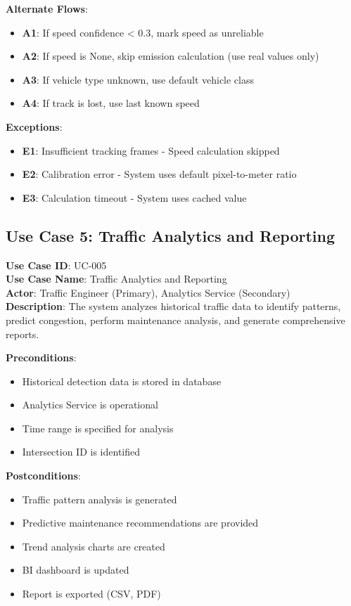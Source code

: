 \documentclass[12pt,a4paper]{article}
\begin{document}
\textbf{Alternate Flows}:
\begin{itemize}
    \item \textbf{A1}: If speed confidence < 0.3, mark speed as unreliable
    \item \textbf{A2}: If speed is None, skip emission calculation (use real values only)
    \item \textbf{A3}: If vehicle type unknown, use default vehicle class
    \item \textbf{A4}: If track is lost, use last known speed
\end{itemize}

\textbf{Exceptions}:
\begin{itemize}
    \item \textbf{E1}: Insufficient tracking frames - Speed calculation skipped
    \item \textbf{E2}: Calibration error - System uses default pixel-to-meter ratio
    \item \textbf{E3}: Calculation timeout - System uses cached value
\end{itemize}

\subsection{Use Case 5: Traffic Analytics and Reporting}

\textbf{Use Case ID}: UC-005 \\
\textbf{Use Case Name}: Traffic Analytics and Reporting \\
\textbf{Actor}: Traffic Engineer (Primary), Analytics Service (Secondary) \\
\textbf{Description}: The system analyzes historical traffic data to identify patterns, predict congestion, perform maintenance analysis, and generate comprehensive reports.

\textbf{Preconditions}:
\begin{itemize}
    \item Historical detection data is stored in database
    \item Analytics Service is operational
    \item Time range is specified for analysis
    \item Intersection ID is identified
\end{itemize}

\textbf{Postconditions}:
\begin{itemize}
    \item Traffic pattern analysis is generated
    \item Predictive maintenance recommendations are provided
    \item Trend analysis charts are created
    \item BI dashboard is updated
    \item Report is exported (CSV, PDF)
\end{itemize}
\end{document}

